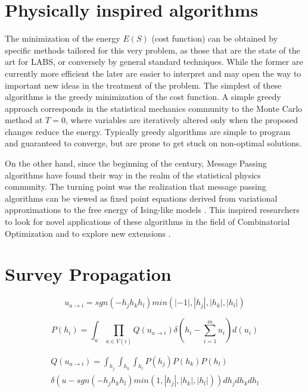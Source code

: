 \documentclass[11pt]{amsart}
\theoremstyle{definition} \newtheorem{defi}{Definition}
\begin{document}
\section{Physically inspired algorithms}

The minimization of the energy $E(S)$ (cost function) can be obtained by specific methods tailored for this very problem, as
those that are the state of the art for LABS, or conversely by general standard techniques. While the former are currently more efficient
the later are easier to interpret and  may open the way to important new ideas in the treatment of the problem.
The simplest of these algorithms is the greedy minimization of the cost function. A simple greedy approach corresponds in the statistical mechanics community
to the Monte Carlo method at $T=0$, where variables are iteratively altered only when the proposed changes reduce the energy.
Typically greedy algorithms are simple to program and guaranteed to converge, but are prone to get stuck on non-optimal solutions.

On the other hand, since the beginning of the century,  Message Passing algorithms have found their way in the realm of the statistical physics community.
The turning point was the realization that message passing algorithms can be viewed as fixed point equations derived from variational approximations to the free energy of Ising-like models \cite{Yedidia02}.
This inspired researchers to look for novel applications of these algorithms in the field of Combinatorial Optimization \cite{Mulet02, Braunstein03, Weigt06} and to explore new extensions \cite{SP,CVM,GBP}.

\section{Survey Propagation}

	\begin{equation}
	u_{a \to i}=sgn(- h_j h_k h_l)min(|-1|,|h_j|,|h_k|,|h_l|)
	\end{equation}
	
	\begin{equation}
	P(h_i) = \int_{u}\prod_{a \in V(i)} Q(u_{a\to i})
	\delta(h_i -\sum_{i=1}^m u_i) d(u_i)
	\end{equation}

	\begin{multline}
	Q(u_{a \to i}) = \int_{h_j}\int_{h_k}\int_{h_l}P(h_j)P(h_k)P(h_l)
	\\
	\delta(u-sgn(- h_j h_k h_l)min(1,|h_j|,|h_k|,|h_l|))dh_j dh_k dh_l
	\end{multline} 
\end{document}
